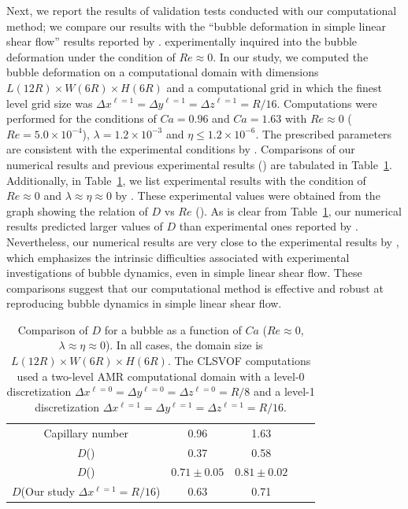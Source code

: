 \documentclass{elsarticle}
\newcommand{\lwh}[3]{L(#1R)\times W(#2R) \times H(#3R)}
\begin{document}
Next, we report the results of validation tests conducted with our computational method; we compare our results with the ``bubble deformation in simple linear shear flow'' results reported by \citet{MulTobDreFisWin08}.  \citet{MulTobDreFisWin08} experimentally inquired into the bubble deformation under the condition of $Re \approx 0$.  In our study, we computed the bubble deformation on a computational domain with dimensions $\lwh{12}{6}{6}$ and a computational grid in which the finest level grid size was $\Delta x^{\ell=1} = \Delta y^{\ell=1} = \Delta z^{\ell=1} = R/16$.  Computations were performed for the conditions of $Ca = 0.96$ and $Ca = 1.63$ with $Re \approx 0$ ($Re = 5.0 \times 10^{-4}$),  $\lambda = 1.2 \times 10^{-3}$ and  $\eta \leq 1.2 \times 10^{-6}$.  The prescribed parameters are consistent with the experimental conditions by  \citet{MulTobDreFisWin08}.  Comparisons of our numerical results and previous experimental results (\citet{MulTobDreFisWin08}) are tabulated in Table~\ref{tab:DeComparisonRe=0}.  Additionally, in Table~\ref{tab:DeComparisonRe=0}, we list experimental results with the condition of $Re \approx 0$ and $\lambda \approx \eta \approx 0$ by  \citet{RusMan02}.  These experimental values were obtained from the graph showing the relation of $D$ vs $Re$ (\citet{RusMan02}).  As is clear from Table~\ref{tab:DeComparisonRe=0}, our numerical results predicted larger values of $D$ than experimental ones reported by \citet{MulTobDreFisWin08}. Nevertheless, our numerical results are very close to the experimental results by \citet{RusMan02}, which emphasizes the intrinsic difficulties associated with experimental investigations of bubble dynamics, even in simple linear shear flow.  These comparisons suggest that our computational method is effective and robust at reproducing bubble dynamics in simple linear shear flow.
\begin{table}[tbh]
\caption{Comparison of $D$ for a bubble as a function of $Ca$ ($Re \approx 0$, $\lambda \approx \eta \approx 0$).  In all cases, the domain size is $\lwh{12}{6}{6}$.  The CLSVOF computations used a two-level AMR computational domain with a level-0 discretization $\Delta x^{\ell=0} = \Delta y^{\ell=0} = \Delta z^{\ell=0} = R/8$ and a level-1 discretization $\Delta x^{\ell=1} = \Delta y^{\ell=1} = \Delta z^{\ell=1} = R/16$.}
\label{tab:DeComparisonRe=0}
\center
\begin{tabular}{ c  c  c  c  c }
\hline
\hline
Capillary number & 0.96  & 1.63  \\
{$D$}(\citet{MulTobDreFisWin08})   & 0.37   &   0.58     \\
{$D$}(\citet{RusMan02})    & $0.71\pm 0.05$   &   $0.81\pm 0.02$     \\
{$D$}(Our study $\Delta x^{\ell=1}=R/16$)  & 0.63   &   0.71     \\
\hline
\hline
\end{tabular}
\end{table}
\end{document}
